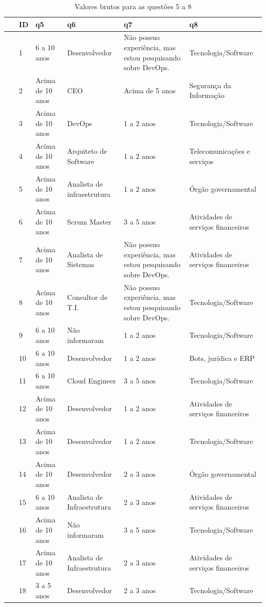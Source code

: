 \documentclass[twoside,english,brazilian]{UNISINOSartigo}
\begin{document}
\begin{table}[h]
\footnotesize
    \caption{Valores brutos para as questões 5 a 8}
    \begin{tabularx}{\textwidth}{llll>{\raggedright}Xl}
    \hline
~ & ID & q5 & q6 & q7 & q8 \\ \hline
~ & 1 & 6 a 10 anos & Desenvolvedor & Não possuo experiência, mas estou pesquisando sobre DevOps. & Tecnologia/Software \\
~ & 2 & Acima de 10 anos & CEO & Acima de 5 anos & Segurança da Informação \\
~ & 3 & Acima de 10 anos & DevOps & 1 a 2 anos & Tecnologia/Software \\
~ & 4 & Acima de 10 anos & Arquiteto de Software & 1 a 2 anos & Telecomunicações e serviços \\
~ & 5 & Acima de 10 anos & Analista de infraestrutura & 1 a 2 anos & Órgão governamental \\
~ & 6 & Acima de 10 anos & Scrum Master & 3 a 5 anos & Atividades de serviços financeiros \\
~ & 7 & Acima de 10 anos & Analista de Sistemas & Não possuo experiência, mas estou pesquisando sobre DevOps. & Atividades de serviços financeiros \\
~ & 8 & Acima de 10 anos & Consultor de T.I. & Não possuo experiência, mas estou pesquisando sobre DevOps. & Tecnologia/Software \\
~ & 9 & 6 a 10 anos & Não informaram & 1 a 2 anos & Tecnologia/Software \\
~ & 10 & 6 a 10 anos & Desenvolvedor & 1 a 2 anos & Bots, jurídica e ERP \\
~ & 11 & 6 a 10 anos & Cloud Engineer & 3 a 5 anos & Tecnologia/Software \\
~ & 12 & Acima de 10 anos & Desenvolvedor & 1 a 2 anos & Atividades de serviços financeiros \\
~ & 13 & Acima de 10 anos & Desenvolvedor & 1 a 2 anos & Tecnologia/Software \\
~ & 14 & Acima de 10 anos & Desenvolvedor & 2 a 3 anos & Órgão governamental \\
~ & 15 & 6 a 10 anos & Analista de Infraestrutura & 2 a 3 anos & Atividades de serviços financeiros \\
~ & 16 & Acima de 10 anos & Não informaram & 3 a 5 anos & Tecnologia/Software \\
~ & 17 & Acima de 10 anos & Analista de Infraestrutura & 2 a 3 anos & Atividades de serviços financeiros \\
~ & 18 & 3 a 5 anos & Desenvolvedor & 2 a 3 anos & Tecnologia/Software \\

\end{tabularx}
\end{table}
\end{document}
